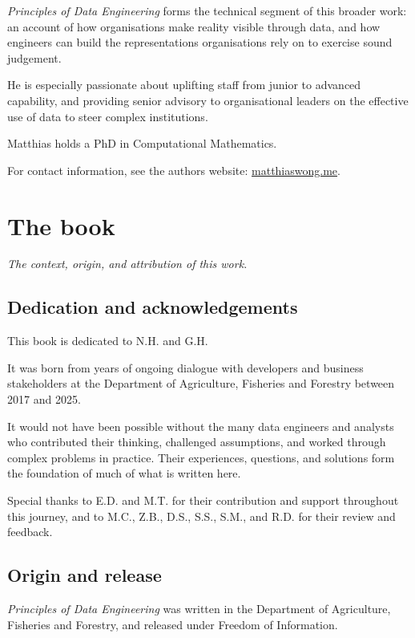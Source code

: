 \documentclass[10pt,openany,10pt]{book}
\begin{document}
\emph{Principles of Data Engineering} forms the technical segment of
this broader work: an account of how organisations make reality visible
through data, and how engineers can build the representations
organisations rely on to exercise sound judgement.

He is especially passionate about uplifting staff from junior to
advanced capability, and providing senior advisory to organisational
leaders on the effective use of data to steer complex institutions.

Matthias holds a PhD in Computational Mathematics.

For contact information, see the author\textquotesingle s website:
\href{https://matthiaswong.me/?utm_source=pde_book}{matthiaswong.me}.

\newpage

\chapter{The book}\label{docs-about-the-book}

\emph{The context, origin, and attribution of this work.}

\section{Dedication and
acknowledgements}\label{dedication-and-acknowledgements}

This book is dedicated to N.H. and G.H.

It was born from years of ongoing dialogue with developers and business
stakeholders at the Department of Agriculture, Fisheries and Forestry
between 2017 and 2025.

It would not have been possible without the many data engineers and
analysts who contributed their thinking, challenged assumptions, and
worked through complex problems in practice. Their experiences,
questions, and solutions form the foundation of much of what is written
here.

Special thanks to E.D. and M.T. for their contribution and support
throughout this journey, and to M.C., Z.B., D.S., S.S., S.M., and R.D.
for their review and feedback.

\section{Origin and release}\label{origin-and-release}

\emph{Principles of Data Engineering} was written in the Department of
Agriculture, Fisheries and Forestry, and released under Freedom of
Information.
\end{document}

